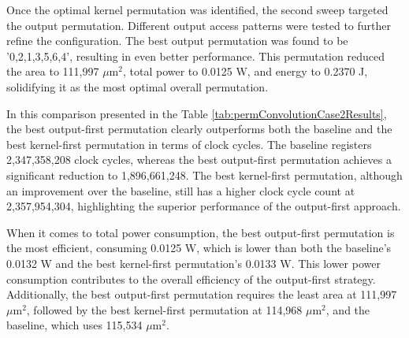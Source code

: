 Once the optimal kernel permutation was identified, the second sweep targeted the output permutation. Different output access patterns were tested to further refine the configuration. The best output permutation was found to be '0,2,1,3,5,6,4', resulting in even better performance. This permutation reduced the area to 111,997 $\mu\text{m}^2$, total power to 0.0125 W, and energy to 0.2370 J, solidifying it as the most optimal overall permutation.
\\
\begin{table}[H]
\centering
\caption{Loop permutation results}
\label{tab:permConvolutionCase2Results}
\end{table}

In this comparison presented in the Table \ref{tab:permConvolutionCase2Results}, the best output-first permutation clearly outperforms both the baseline and the best kernel-first permutation in terms of clock cycles. The baseline registers 2,347,358,208 clock cycles, whereas the best output-first permutation achieves a significant reduction to 1,896,661,248. The best kernel-first permutation, although an improvement over the baseline, still has a higher clock cycle count at 2,357,954,304, highlighting the superior performance of the output-first approach.

When it comes to total power consumption, the best output-first permutation is the most efficient, consuming 0.0125 W, which is lower than both the baseline's 0.0132 W and the best kernel-first permutation's 0.0133 W. This lower power consumption contributes to the overall efficiency of the output-first strategy. Additionally, the best output-first permutation requires the least area at 111,997 $\mu\text{m}^2$, followed by the best kernel-first permutation at 114,968 $\mu\text{m}^2$, and the baseline, which uses 115,534 $\mu\text{m}^2$.

